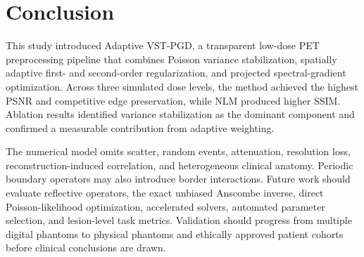 \section{Conclusion}
This study introduced Adaptive VST-PGD, a transparent low-dose PET preprocessing pipeline that combines Poisson variance stabilization, spatially adaptive first- and second-order regularization, and projected spectral-gradient optimization. Across three simulated dose levels, the method achieved the highest PSNR and competitive edge preservation, while NLM produced higher SSIM. Ablation results identified variance stabilization as the dominant component and confirmed a measurable contribution from adaptive weighting.

The numerical model omits scatter, random events, attenuation, resolution loss, reconstruction-induced correlation, and heterogeneous clinical anatomy. Periodic boundary operators may also introduce border interactions. Future work should evaluate reflective operators, the exact unbiased Anscombe inverse, direct Poisson-likelihood optimization, accelerated solvers, automated parameter selection, and lesion-level task metrics. Validation should progress from multiple digital phantoms to physical phantoms and ethically approved patient cohorts before clinical conclusions are drawn.
